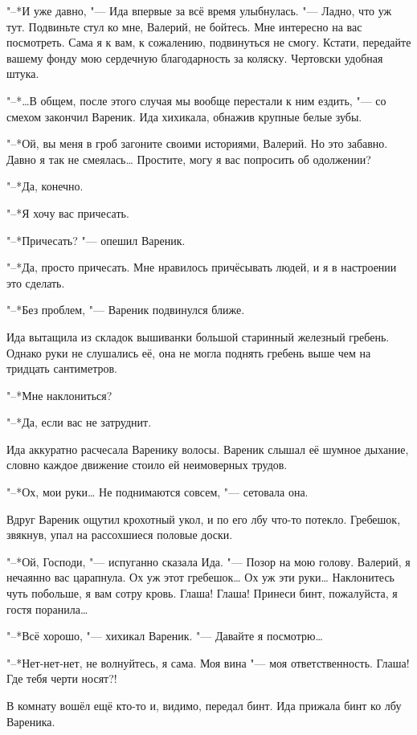 "--*И уже давно, "--- Ида впервые за всё время улыбнулась.
"--- Ладно, что уж тут.
Подвиньте стул ко мне, Валерий, не бойтесь.
Мне интересно на вас посмотреть.
Сама я к вам, к сожалению, подвинуться не смогу.
Кстати, передайте вашему фонду мою сердечную благодарность за коляску.
Чертовски удобная штука.

\asterism

"--*\ldots{}В общем, после этого случая мы вообще перестали к ним ездить, "--- со смехом закончил Вареник.
Ида хихикала, обнажив крупные белые зубы.

"--*Ой, вы меня в гроб загоните своими историями, Валерий.
Но это забавно.
Давно я так не смеялась\ldots{}
Простите, могу я вас попросить об одолжении?

"--*Да, конечно.

"--*Я хочу вас причесать.

"--*Причесать? "--- опешил Вареник.

"--*Да, просто причесать.
Мне нравилось причёсывать людей, и я в настроении это сделать.

"--*Без проблем, "--- Вареник подвинулся ближе.

Ида вытащила из складок вышиванки большой старинный железный гребень.
Однако руки не слушались её, она не могла поднять гребень выше чем на тридцать сантиметров.

"--*Мне наклониться?

"--*Да, если вас не затруднит.

Ида аккуратно расчесала Варенику волосы.
Вареник слышал её шумное дыхание, словно каждое движение стоило ей неимоверных трудов.

"--*Ох, мои руки\ldots{}
Не поднимаются совсем, "--- сетовала она.

Вдруг Вареник ощутил крохотный укол, и по его лбу что-то потекло.
Гребешок, звякнув, упал на рассохшиеся половые доски.

"--*Ой, Господи, "--- испуганно сказала Ида.
"--- Позор на мою голову.
Валерий, я нечаянно вас царапнула.
Ох уж этот гребешок\ldots{}
Ох уж эти руки\ldots{}
Наклонитесь чуть побольше, я вам сотру кровь.
Глаша!
Глаша!
Принеси бинт, пожалуйста, я гостя поранила\ldots{}

"--*Всё хорошо, "--- хихикал Вареник.
"--- Давайте я посмотрю\ldots{}

"--*Нет-нет-нет, не волнуйтесь, я сама.
Моя вина "--- моя ответственность.
Глаша!
Где тебя черти носят?!

В комнату вошёл ещё кто-то и, видимо, передал бинт.
Ида прижала бинт ко лбу Вареника.

